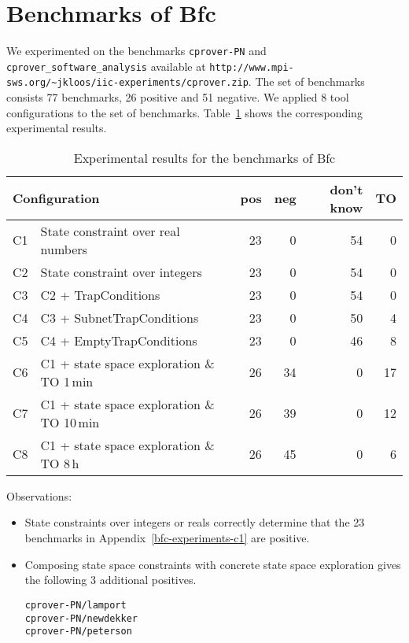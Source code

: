 \documentclass{article}
\newcommand{\bfc}{{\sc Bfc}}
\newcommand{\ttt}[1]{\texttt{#1}}
\begin{document}
\fi

\section{Benchmarks of \bfc}

We experimented on the benchmarks \ttt{cprover-PN} and
\ttt{cprover\_software\_analysis}
available at
\ttt{http://www.mpi-sws.org/\~{}jkloos/iic-experiments/cprover.zip}.
The set of benchmarks consists 77 benchmarks, 26 positive and 51 negative.
We applied 8 tool configurations to the set of benchmarks.
Table~\ref{bfc-experiments} shows the corresponding experimental results.

\begin{table}[h]
\begin{center}
  \begin{tabular}{ | r | p{7cm} | r | r | r | r | } %
    \hline
    \multicolumn{2}{|l|}{Configuration} & pos & neg & don't know & TO \\
    \hline
    C1 & State constraint over real numbers & 23 &  0 & 54 &  0 \\
    C2 & State constraint over integers        & 23 &  0 & 54 &  0 \\
    \hline
    C3 & C2 + TrapConditions                   & 23 &  0 & 54 &  0 \\
    C4 & C3 + SubnetTrapConditions         & 23 &  0 & 50 &  4 \\
    C5 & C4 + EmptyTrapConditions          & 23 &  0 & 46 &  8 \\
    \hline
    C6 & C1 + state space exploration \& TO 1\,min & 26 & 34 & 0 & 17 \\
    C7 & C1 + state space exploration \& TO 10\,min & 26 & 39 & 0 & 12 \\
    C8 & C1 + state space exploration \& TO 8\,h   & 26 & 45 & 0 &  6 \\
    \hline
  \end{tabular}
\end{center}
\caption{Experimental results for the benchmarks of \bfc}
\label{bfc-experiments}
\end{table}

Observations:
\begin{itemize}
\item State constraints over integers or reals correctly determine that the 23 benchmarks in Appendix~\ref{bfc-experiments-c1} are positive.
\item Composing state space constraints with concrete state space
  exploration gives the following 3 additional positives.
\begin{verbatim}
cprover-PN/lamport
cprover-PN/newdekker
cprover-PN/peterson
\end{verbatim}
\end{itemize}
\end{document}

